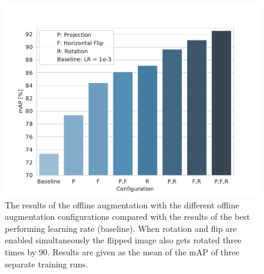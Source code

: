 \begin{figure}
\begin{center}
    \includegraphics[width=13cm]{imgs/yolo_offline_aug_experiment.pdf}
    \caption{The results of the offline augmentation with the different offline augmentation configurations compared with the results of the best performing learning rate (baseline). When rotation and flip are enabled simultaneously the flipped image also gets rotated three times by 90\textdegree. Results are given as the mean of the mAP of three separate training runs.}
    \label{fig:yolo_offline_aug_results}
\end{center}
\end{figure}

